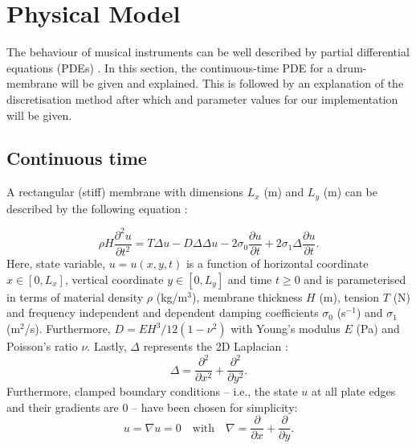 \documentclass{vgtc}
\begin{document}
\section{Physical Model}\label{sec:PM}
The behaviour of musical instruments can be well described by partial differential equations (PDEs) \cite{Fletcher1998}. In this section, the continuous-time PDE for a drum-membrane will be given and explained. This is followed by an explanation of the discretisation method after which and parameter values for our implementation will be given. 

\subsection{Continuous time}
A rectangular (stiff) membrane with dimensions $L_x$ (m) and $L_y$ (m) can be described by the following equation \cite{bilbao2009numerical}:

\begin{equation}
\rho H\frac{\partial^2u}{\partial t^2} = T\Delta u - D\Delta\Delta u - 2 \sigma_0\frac{\partial u}{\partial t} + 2 \sigma_1 \Delta \frac{\partial u}{\partial t}.
\end{equation}
Here, state variable, $u = u(x,y,t)$ is a function of horizontal coordinate $x \in [0, L_x]$, vertical coordinate $y \in [0, L_y]$ and time $t\geq0$ and is parameterised in terms of material density $\rho$ (kg/m$^3$), membrane thickness $H$ (m), tension $T$ (N) and frequency independent and dependent damping coefficients $\sigma_0$ (s$^{-1}$) and $\sigma_1$ (m$^2$/s). Furthermore, $D = EH^3/12(1-\nu^2)$ with Young's modulus $E$ (Pa) and Poisson's ratio $\nu$. Lastly, $\Delta$ represents the 2D Laplacian \cite{bilbao2009numerical}:
\begin{equation}\label{eq:PDE}
    \Delta = \frac{\partial^2}{\partial x^2} + \frac{\partial^2}{\partial y^2}.
\end{equation}
Furthermore, clamped boundary conditions -- i.e., the state $u$ at all plate edges and their gradients are 0 -- have been chosen for simplicity:
\begin{equation}
    u = \nabla u = 0 \quad \text{with} \quad \nabla = \frac{\partial}{\partial x} + \frac{\partial}{\partial y}.
\end{equation}
\end{document}
